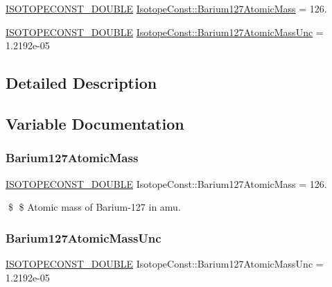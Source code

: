 \begin{DoxyCompactItemize}
\item 
\mbox{\hyperlink{group___isotope_const-_macros_ga8f45a7272ce02c0b4c65c44636ed719a}{I\+S\+O\+T\+O\+P\+E\+C\+O\+N\+S\+T\+\_\+\+D\+O\+U\+B\+LE}} \mbox{\hyperlink{group___isotope_const-_barium-_ba127_ga64745feebc1ec1b77dcce7444fe415fa}{Isotope\+Const\+::\+Barium127\+Atomic\+Mass}} = 126.
\item 
\mbox{\hyperlink{group___isotope_const-_macros_ga8f45a7272ce02c0b4c65c44636ed719a}{I\+S\+O\+T\+O\+P\+E\+C\+O\+N\+S\+T\+\_\+\+D\+O\+U\+B\+LE}} \mbox{\hyperlink{group___isotope_const-_barium-_ba127_ga2efe9ecfec0a7672b79dd47d3109f913}{Isotope\+Const\+::\+Barium127\+Atomic\+Mass\+Unc}} = 1.\+2192e-\/05
\end{DoxyCompactItemize}


\subsection{Detailed Description}


\subsection{Variable Documentation}
\mbox{\label{group___isotope_const-_barium-_ba127_ga64745feebc1ec1b77dcce7444fe415fa}} 
\subsubsection{\texorpdfstring{Barium127\+Atomic\+Mass}{Barium127AtomicMass}}
{\footnotesize\ttfamily \mbox{\hyperlink{group___isotope_const-_macros_ga8f45a7272ce02c0b4c65c44636ed719a}{I\+S\+O\+T\+O\+P\+E\+C\+O\+N\+S\+T\+\_\+\+D\+O\+U\+B\+LE}} Isotope\+Const\+::\+Barium127\+Atomic\+Mass = 126.}

\$ \$ Atomic mass of Barium-\/127 in amu. \mbox{\label{group___isotope_const-_barium-_ba127_ga2efe9ecfec0a7672b79dd47d3109f913}} 
\subsubsection{\texorpdfstring{Barium127\+Atomic\+Mass\+Unc}{Barium127AtomicMassUnc}}
{\footnotesize\ttfamily \mbox{\hyperlink{group___isotope_const-_macros_ga8f45a7272ce02c0b4c65c44636ed719a}{I\+S\+O\+T\+O\+P\+E\+C\+O\+N\+S\+T\+\_\+\+D\+O\+U\+B\+LE}} Isotope\+Const\+::\+Barium127\+Atomic\+Mass\+Unc = 1.\+2192e-\/05}

